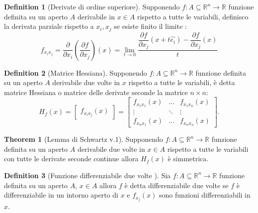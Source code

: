 \documentclass[leqno]{article}
\theoremstyle{definition}
\newtheorem{definition}{Definition}[section]
\numberwithin{equation}{section}
\newtheorem{theorem}{Theorem}[section]
\theoremstyle{remark}
\begin{document}
	\begin{definition}[Derivate di ordine superiore]
		Supponendo $f:A\subseteq \mathbb{R}^n \rightarrow \mathbb{R}$ funzione definita su un aperto $A$ derivabile in $x\in A$ rispetto a tutte le variabili, definisco la derivata parziale rispetto a $x_i,x_j$ se esiste finito il limite :
		\begin{equation}
			f_{x_ix_j}=\frac{\partial 
			}{\partial x_i}\left({\frac {\partial f}{\partial x_{j}}}\right)(x)=\lim _{t\to 0}{\frac {\dfrac {\partial f}{\partial x_{j}}(  {x} +t  \hat{e_{i}})-\dfrac {\partial f}{\partial x_{j}}(  {x} )}{t}}
		\end{equation}
	\end{definition}
	
	\begin{definition}[Matrice Hessiana]
		Supponendo $f:A\subseteq \mathbb{R}^n \rightarrow \mathbb{R}$ funzione definita su un aperto $A$ derivabile due volte in $x$ rispetto a tutte le variabili, è detta matrice Hessiana o matrice delle derivate seconde la matrice $n \times n$:
		\begin{equation}
			H_f(x)=\begin{bmatrix}
				f_{x_ix_j}(x)
			\end{bmatrix}=\begin{bmatrix}
				f_{x_1x_1}(x) & \dots & f_{x_1x_n}(x)\\
				\vdots & \ddots & \vdots \\
				f_{x_nx_1}(x) & \dots & f_{x_nx_n}(x)
			\end{bmatrix}.
		\end{equation}
	\end{definition}
	
	\begin{theorem}[Lemma di Schwartz v.1]
		Supponendo $f:A\subseteq \mathbb{R}^n \rightarrow \mathbb{R}$ funzione definita su un aperto $A$ derivabile due volte in $x\in A$ rispetto a tutte le variabili con tutte le derivate seconde continue allora $H_f(x)$ è simmetrica.
	\end{theorem}
	
	\begin{definition}[Funzione differenziabile due volte ]
		Sia $f:A\subseteq \mathbb{R}^n \rightarrow \mathbb{R}$ funzione definita su un aperto $A$, $x\in A$ allora $f$ è detta differenziabile due volte se $f$ è differenziabile in un intorno aperto di $x$ e $f_{x_j}(x)$ sono funzioni differenziabili in $x$.
	\end{definition}
	
\end{document}
